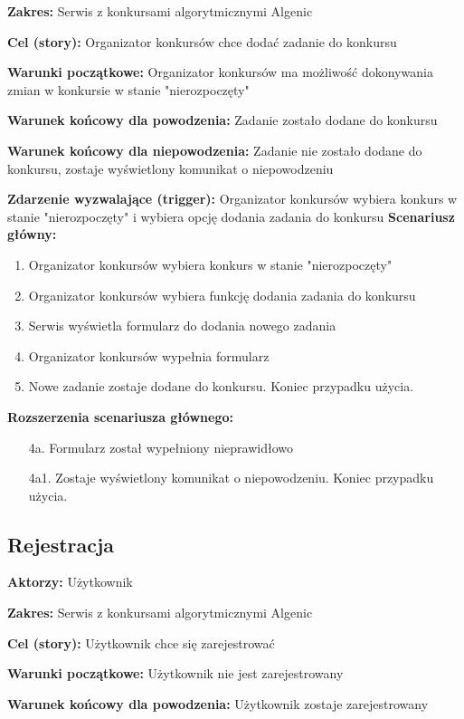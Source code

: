 \documentclass{article}
\begin{document}
\textbf{Zakres:} Serwis z konkursami algorytmicznymi Algenic  

\textbf{Cel (story):} Organizator konkursów chce dodać zadanie do konkursu  

\textbf{Warunki początkowe:} Organizator konkursów ma możliwość dokonywania zmian w konkursie w stanie "nierozpoczęty"  

\textbf{Warunek końcowy dla powodzenia:} Zadanie zostało dodane do konkursu  

\textbf{Warunek końcowy dla niepowodzenia:} Zadanie nie zostało dodane do konkursu, zostaje wyświetlony komunikat o niepowodzeniu  

\textbf{Zdarzenie wyzwalające (trigger):} Organizator konkursów wybiera konkurs w stanie "nierozpoczęty" i wybiera opcję dodania zadania 
do konkursu
\textbf{Scenariusz główny:}
\begin{enumerate}
	\item Organizator konkursów wybiera konkurs w stanie "nierozpoczęty"
	\item Organizator konkursów wybiera funkcję dodania zadania do konkursu
	\item Serwis wyświetla formularz do dodania nowego zadania
	\item Organizator konkursów wypełnia formularz
	\item Nowe zadanie zostaje dodane do konkursu. Koniec przypadku użycia.
\end{enumerate}

\textbf{Rozszerzenia scenariusza głównego:}
\begin{itemize}
	\item[4a.] Formularz został wypełniony nieprawidłowo  
	\item[4a1.] Zostaje wyświetlony komunikat o niepowodzeniu. Koniec przypadku użycia.
\end{itemize}

\newpage
\subsection{Rejestracja}

\textbf{Aktorzy:} Użytkownik

\textbf{Zakres:} Serwis z konkursami algorytmicznymi Algenic

\textbf{Cel (story):} Użytkownik chce się zarejestrować

\textbf{Warunki początkowe:} Użytkownik nie jest zarejestrowany

\textbf{Warunek końcowy dla powodzenia:} Użytkownik zostaje zarejestrowany
\end{document}
